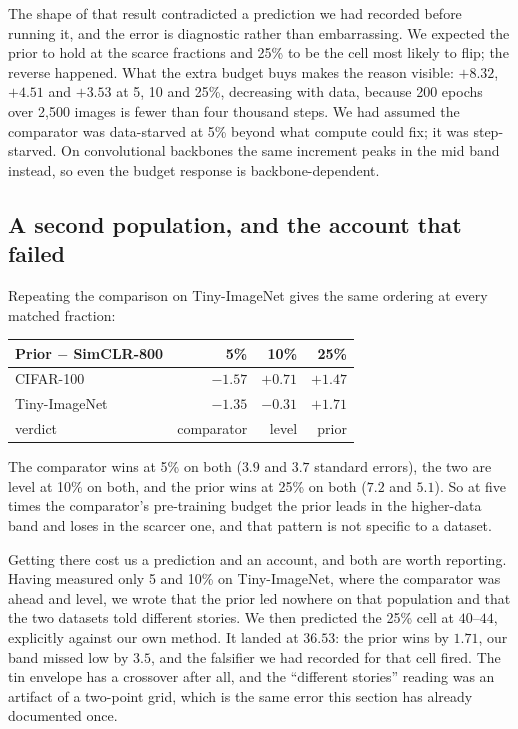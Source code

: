 The shape of that result contradicted a prediction we had recorded before
running it, and the error is diagnostic rather than embarrassing. We
expected the prior to hold at the scarce fractions and 25\% to be the cell
most likely to flip; the reverse happened. What the extra budget buys makes
the reason visible: $+8.32$, $+4.51$ and $+3.53$ at 5, 10 and 25\%,
decreasing with data, because 200 epochs over 2{,}500 images is fewer than
four thousand steps. We had assumed the comparator was data-starved at 5\%
beyond what compute could fix; it was step-starved. On convolutional
backbones the same increment peaks in the mid band instead, so even the
budget response is backbone-dependent.

\subsection{A second population, and the account that
failed}\label{sec:budget:tin}
Repeating the comparison on Tiny-ImageNet gives the same ordering at every
matched fraction:

\begin{center}\scriptsize
\begin{tabular}{@{}lrrr@{}}
\toprule
Prior $-$ SimCLR-800 & 5\% & 10\% & 25\% \\
\midrule
CIFAR-100      & $-1.57$ & $+0.71$ & $+1.47$ \\
Tiny-ImageNet  & $-1.35$ & $-0.31$ & $+1.71$ \\
\midrule
verdict & comparator & level & prior \\
\bottomrule
\end{tabular}
\end{center}

\noindent The comparator wins at 5\% on both ($3.9$ and $3.7$ standard
errors), the two are level at 10\% on both, and the prior wins at 25\% on
both ($7.2$ and $5.1$). So at five times the comparator's pre-training
budget the prior leads in the higher-data band and loses in the scarcer one,
and that pattern is not specific to a dataset.

Getting there cost us a prediction and an account, and both are worth
reporting. Having measured only 5 and 10\% on Tiny-ImageNet, where the
comparator was ahead and level, we wrote that the prior led nowhere on that
population and that the two datasets told different stories. We then
predicted the 25\% cell at $40$--$44$, explicitly against our own method.
It landed at $36.53$: the prior wins by $1.71$, our band missed low by
$3.5$, and the falsifier we had recorded for that cell fired. The tin
envelope has a crossover after all, and the ``different stories'' reading
was an artifact of a two-point grid, which is the same error this section
has already documented once.

